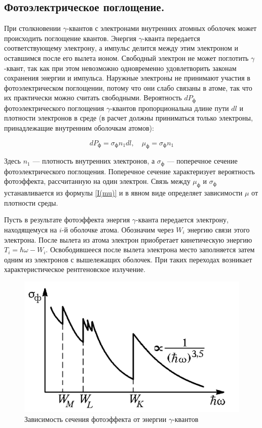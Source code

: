 \documentclass[a4paper,12pt]{article} %
\newcommand{\ga}{\ensuremath{\gamma}}
\begin{document}
	\subsection{Фотоэлектрическое поглощение.} При столкновении \ga-квантов с
	электронами внутренних атомных оболочек может происходить поглощение квантов. Энергия \ga-кванта передается соответствующему электрону, а импульс делится между этим электроном и оставшимся после
	его вылета ионом. Свободный электрон не может поглотить \ga-квант,
	так как при этом невозможно одновременно удовлетворить законам
	сохранения энергии и импульса. Наружные электроны не принимают участия в фотоэлектрическом поглощении, потому что они слабо
	связаны в атоме, так что их практически можно считать свободными.
	Вероятность $ dP_{\text{ф}} $ фотоэлектрического поглощения \ga-квантов пропорциональна длине пути $ dl $ и плотности электронов в среде (в расчет
	должны приниматься только электроны, принадлежащие внутренним
	оболочкам атомов):
	
	\begin{equation}\label{mu ph}
		dP_{\text{ф}} = \sigma_{\text{ф}} n_1 dl, \quad \mu_{\text{ф}} = \sigma_{\text{ф}} n_1
	\end{equation}
	
	Здесь $ n_1 $ --- плотность внутренних электронов, а $ \sigma_{\text{ф}} $ --- поперечное сечение фотоэлектрического поглощения. Поперечное сечение характеризует вероятность фотоэффекта, рассчитанную на один электрон. Связь между $ \mu_{\text{ф}} $ и $ \sigma_{\text{ф}} $ устанавливается из формулы \eqref{I(mu)} и в явном виде определяет зависимости $ \mu $ от плотности среды.
	
	Пусть в результате фотоэффекта энергия \ga-кванта передается
	электрону, находящемуся на $ i $-й оболочке атома. Обозначим через $ W_i $
	энергию связи этого электрона. После вылета из атома электрон приобретает кинетическую энергию $ T_i = \hbar \omega - W_i $.
	Освободившееся после вылета электрона место заполняется затем
	одним из электронов с вышележащих оболочек. При таких переходах
	возникает характеристическое рентгеновское излучение.
	
	\begin{figure}
		\includegraphics[width=\linewidth]{photo}
		\caption{Зависимость сечения фотоэффекта от энергии \ga-квантов}
		\label{ris photo}
	\end{figure}
	
\end{document}
